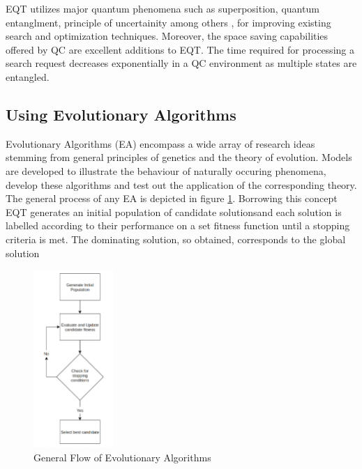 \documentclass[conference]{IEEEtran}
\begin{document}
EQT utilizes major quantum phenomena such as superposition, quantum entanglment, principle of uncertainity among others \cite{az}, for improving existing search and optimization techniques. Moreover, the space saving capabilities offered by QC are excellent additions to EQT.  The time required for processing a search request decreases exponentially in a QC environment as multiple states are entangled.  

\subsection{Using Evolutionary Algorithms}

Evolutionary Algorithms (EA) \cite{vik} encompass a wide array of research ideas stemming from general principles of genetics and the theory of evolution. Models are developed to illustrate the behaviour of naturally occuring phenomena, develop these algorithms and test out the application of the corresponding theory. The general process of any EA is depicted in figure \ref{p1}. Borrowing this concept EQT generates an initial population of candidate solutionsand each solution is labelled according to their performance on a set fitness function until a stopping criteria is met. The dominating solution, so obtained, corresponds to the global solution

\begin{figure}[!t]
\centering\includegraphics[height=6.75cm]{p1.png}
\caption{General Flow of Evolutionary Algorithms}
\label{p1}
\end{figure}
\end{document}
